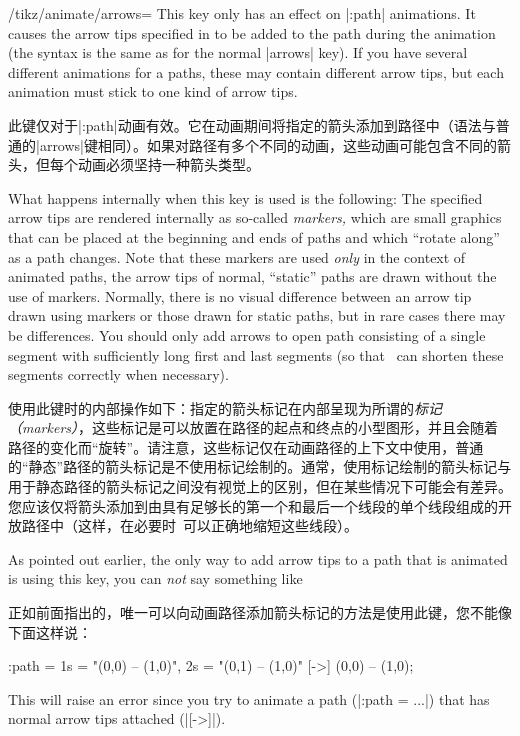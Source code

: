 \begin{key}{/tikz/animate/arrows=}
    This key only has an effect on |:path| animations. It causes the arrow tips
    specified in  to be added to the path during the animation
    (the syntax is the same as for the normal |arrows| key). If you have
    several different animations for a paths, these may contain different arrow
    tips, but each animation must stick to one kind of arrow tips.

    此键仅对于|:path|动画有效。它在动画期间将指定的箭头添加到路径中（语法与普通的|arrows|键相同）。如果对路径有多个不同的动画，这些动画可能包含不同的箭头，但每个动画必须坚持一种箭头类型。



    What happens internally when this key is used is the following: The
    specified arrow tips are rendered internally as so-called \emph{markers,}
    which are small graphics that can be placed at the beginning and ends of
    paths and which ``rotate along'' as a path changes. Note that these markers
    are used \emph{only} in the context of animated paths, the arrow tips of
    normal, ``static'' paths are drawn without the use of markers. Normally,
    there is no visual difference between an arrow tip drawn using markers or
    those drawn for static paths, but in rare cases there may be differences.
    You should only add arrows to open path consisting of a single segment with
    sufficiently long first and last segments (so that \tikzname\ can shorten
    these segments correctly when necessary).

    使用此键时的内部操作如下：指定的箭头标记在内部呈现为所谓的\emph{标记（markers）}，这些标记是可以放置在路径的起点和终点的小型图形，并且会随着路径的变化而“旋转”。请注意，这些标记仅在动画路径的上下文中使用，普通的“静态”路径的箭头标记是不使用标记绘制的。通常，使用标记绘制的箭头标记与用于静态路径的箭头标记之间没有视觉上的区别，但在某些情况下可能会有差异。您应该仅将箭头添加到由具有足够长的第一个和最后一个线段的单个线段组成的开放路径中（这样，在必要时\tikzname\ 可以正确地缩短这些线段）。



    As pointed out earlier, the only way to add arrow tips to a path that is
    animated is using this key, you can \emph{not} say something like
    
    正如前面指出的，唯一可以向动画路径添加箭头标记的方法是使用此键，您不能像下面这样说：


\begin{codeexample}
\draw :path = { 1s = "{(0,0) -- (1,0)}", 2s = "{(0,1) -- (1,0)}" }
  [->] (0,0) -- (1,0);
\end{codeexample}
    This will raise an error since you try to animate a path (|:path = ...|)
    that has normal arrow tips attached (|[->]|).


\end{key}
